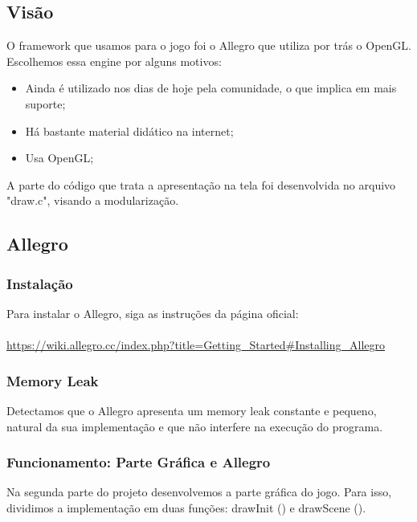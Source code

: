 \documentclass{article}
\begin{document}
\subsection{Visão}
O framework que usamos para o jogo foi o Allegro que utiliza por trás o OpenGL. Escolhemos essa engine por alguns motivos: \\
\begin{itemize}
    \item Ainda é utilizado nos dias de hoje pela comunidade, o que implica em mais suporte;
    \item Há bastante material didático na internet;
    \item Usa OpenGL;
\end{itemize}
A parte do código que trata a apresentação na tela foi desenvolvida no arquivo "draw.c", visando a modularização.

\subsection{Allegro}
\subsubsection{Instalação}
Para instalar o Allegro, siga as instruções da página oficial: \\ \\
\url{https://wiki.allegro.cc/index.php?title=Getting\_Started#Installing\_Allegro}

\subsubsection{Memory Leak}
Detectamos que o Allegro apresenta um memory leak constante e pequeno, natural da sua implementação e que não interfere na execução do programa.

\subsubsection{Funcionamento: Parte Gráfica e Allegro}
Na segunda parte do projeto desenvolvemos a parte gráfica do jogo. Para isso, dividimos a implementação em duas funções: drawInit () e drawScene ().
\end{document}
